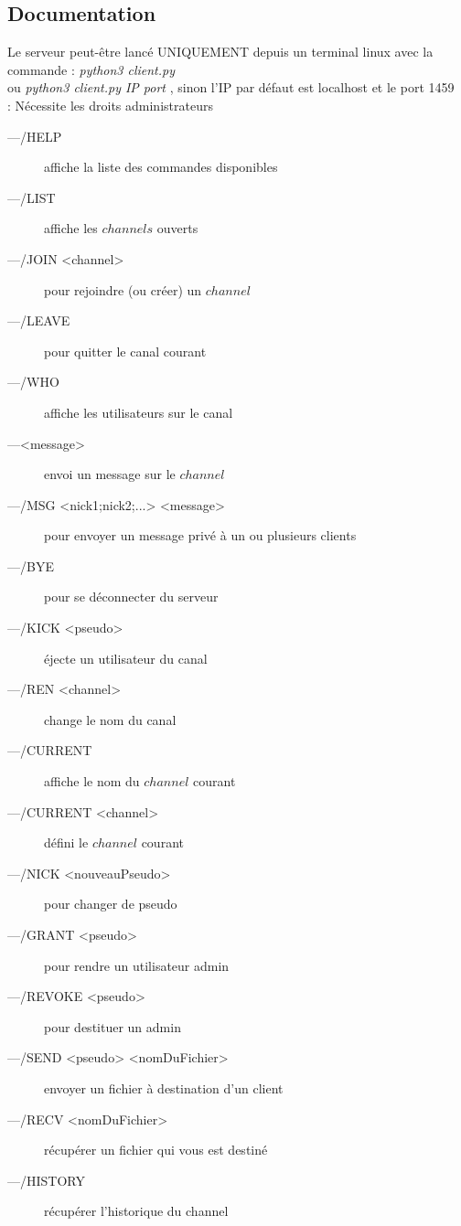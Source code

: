\documentclass[12pt]{article}
\begin{document}
{\subsection{Documentation}
Le serveur peut-être lancé UNIQUEMENT depuis un terminal linux avec
la commande : \emph{python3 client.py}
\\ou \emph{python3 client.py IP port} , sinon l'IP par défaut est localhost et le port 1459
\\ : Nécessite les droits administrateurs
\\
\begin{description}
    \item[---/HELP] affiche la liste des commandes disponibles
\item[---/LIST] affiche les $channels$ ouverts
\item[---/JOIN <channel>] pour rejoindre (ou créer) un $channel$
\item[---/LEAVE] pour quitter le canal courant
\item[---/WHO] affiche les utilisateurs sur le canal
\item[---<message>] envoi un message sur le $channel$
\item[---/MSG <nick1;nick2;...> <message>] pour envoyer un message privé à un ou plusieurs clients
\item[---/BYE] pour se déconnecter du serveur
\item[---/KICK <pseudo>] éjecte un utilisateur du canal
\item[---/REN <channel>] change le nom du canal
\item[---/CURRENT] affiche le nom du $channel$ courant
\item[---/CURRENT <channel>] défini le $channel$ courant
\item[---/NICK <nouveauPseudo>] pour changer de pseudo
\item[---/GRANT <pseudo>] pour rendre un utilisateur admin
\item[---/REVOKE <pseudo>] pour destituer un admin
\item[---/SEND <pseudo> <nomDuFichier>] envoyer un fichier à destination d'un client
\item[---/RECV <nomDuFichier>] récupérer un fichier qui vous est destiné
\item[---/HISTORY] récupérer l'historique du channel
\end{description}



}
\end{document}
